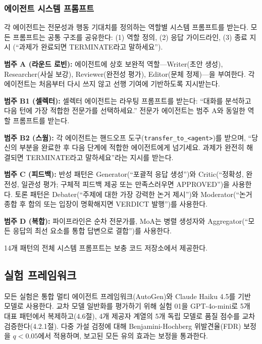 \documentclass[a4paper,11pt]{article}
\begin{document}
\subsubsection{에이전트 시스템 프롬프트}

각 에이전트는 전문성과 행동 기대치를 정의하는 역할별 시스템 프롬프트를 받는다. 모든 프롬프트는 공통 구조를 공유한다: (1) 역할 정의, (2) 응답 가이드라인, (3) 종료 지시 (``과제가 완료되면 TERMINATE라고 말하세요'').

\textbf{범주 A (라운드 로빈):} 에이전트에 상호 보완적 역할---Writer(초안 생성), Researcher(사실 보강), Reviewer(완전성 평가), Editor(문체 정제)---을 부여한다. 각 에이전트는 처음부터 다시 쓰지 않고 선행 기여에 기반하도록 지시받는다.

\textbf{범주 B1 (셀렉터):} 셀렉터 에이전트는 라우팅 프롬프트를 받는다: ``대화를 분석하고 다음 턴에 가장 적합한 전문가를 선택하세요.'' 전문가 에이전트는 범주 A와 동일한 역할 프롬프트를 받는다.

\textbf{범주 B2 (스웜):} 각 에이전트는 핸드오프 도구(\texttt{transfer\_to\_<agent>})를 받으며, ``당신의 부분을 완료한 후 다음 단계에 적합한 에이전트에게 넘기세요. 과제가 완전히 해결되면 TERMINATE라고 말하세요''라는 지시를 받는다.

\textbf{범주 C (피드백):} 반성 패턴은 Generator(``포괄적 응답 생성'')와 Critic(``정확성, 완전성, 일관성 평가; 구체적 피드백 제공 또는 만족스러우면 APPROVED'')을 사용한다. 토론 패턴은 Debater(``주제에 대한 가장 강력한 논거 제시'')와 Moderator(``논거 종합 후 합의 또는 입장이 명확해지면 VERDICT 발행'')를 사용한다.

\textbf{범주 D (복합):} 파이프라인은 순차 전문가를, MoA는 병렬 생성자와 Aggregator(``모든 응답의 최선 요소를 통합 답변으로 결합'')를 사용한다.

14개 패턴의 전체 시스템 프롬프트는 보충 코드 저장소에서 제공한다.

\subsection{실험 프레임워크}

모든 실험은 통합 멀티 에이전트 프레임워크(AutoGen)와 Claude Haiku 4.5를 기반 모델로 사용한다. 교차 모델 일반화를 평가하기 위해 실험 01을 GPT-4o-mini로 5개 대표 패턴에서 복제하고(4.6절), 4개 제공자 계열의 5개 독립 모델로 품질 점수를 교차 검증한다(4.2.1절). 다중 가설 검정에 대해 Benjamini-Hochberg 위발견율(FDR) 보정을 $q < 0.05$에서 적용하며, 보고된 모든 유의 효과는 보정을 통과한다.
\end{document}
